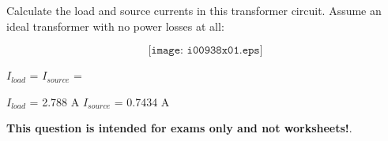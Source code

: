 

Calculate the load and source currents in this transformer circuit.  Assume an ideal transformer with no power losses at all:

$$\texttt{[image: i00938x01.eps]}$$

$I_{load}$ = \hskip 80pt $I_{source}$ = 

\vskip 10pt







$I_{load}$ = 2.788 A \hskip 80pt $I_{source}$ = 0.7434 A







{\bf This question is intended for exams only and not worksheets!}.



